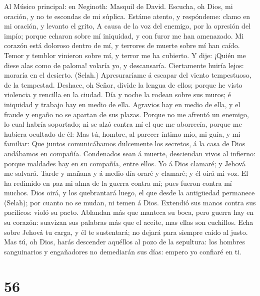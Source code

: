  Al Músico principal: en Neginoth: Masquil de David.
Escucha, oh Dios, mi oración, y no te escondas de mi súplica.
 Estáme atento, y respóndeme: clamo en mi oración, y
levanto el grito,  A causa de la voz del enemigo, por la
opresión del impío; porque echaron sobre mí iniquidad, y con furor me
han amenazado.  Mi corazón está doloroso dentro de mí, y
terrores de muerte sobre mí han caído.  Temor y temblor
vinieron sobre mí, y terror me ha cubierto.  Y dije:
¡Quién me diese alas como de paloma! volaría yo, y descansaría.
 Ciertamente huiría lejos: moraría en el desierto.
(Selah.)  Apresuraríame á escapar del viento tempestuoso,
de la tempestad.  Deshace, oh Señor, divide la lengua de
ellos; porque he visto violencia y rencilla en la ciudad.
 Día y noche la rodean sobre sus muros; é iniquidad y
trabajo hay en medio de ella.  Agravios hay en medio de
ella, y el fraude y engaño no se apartan de sus plazas. 
Porque no me afrentó un enemigo, lo cual habría soportado; ni se alzó
contra mí el que me aborrecía, porque me hubiera ocultado de él:
 Mas tú, hombre, al parecer íntimo mío, mi guía, y mi
familiar:  Que juntos comunicábamos dulcemente los
secretos, á la casa de Dios andábamos en compañía. 
Condenados sean á muerte, desciendan vivos al infierno: porque maldades
hay en su compañía, entre ellos.  Yo á Dios clamaré; y
Jehová me salvará.  Tarde y mañana y á medio día oraré y
clamaré; y él oirá mi voz.  El ha redimido en paz mi alma
de la guerra contra mí; pues fueron contra mí muchos. 
Dios oirá, y los quebrantará luego, el que desde la antigüedad permanece
(Selah); por cuanto no se mudan, ni temen á Dios. 
Extendió sus manos contra sus pacíficos: violó su pacto. 
Ablandan más que manteca su boca, pero guerra hay en su corazón:
suavizan sus palabras más que el aceite, mas ellas son cuchillos.
 Echa sobre Jehová tu carga, y él te sustentará; no
dejará para siempre caído al justo.  Mas tú, oh Dios,
harás descender aquéllos al pozo de la sepultura: los hombres
sanguinarios y engañadores no demediarán sus días: empero yo confiaré en
ti.

\hypertarget{section-55}{%
\section{56}\label{section-55}}

